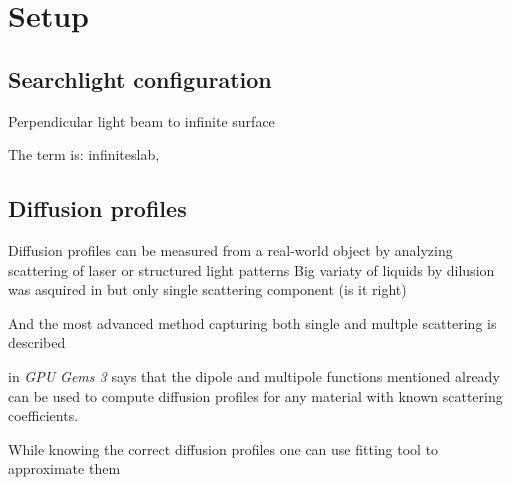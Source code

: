 \chapter{Setup}
\label{chapter:Setup}

\section{Searchlight configuration}
Perpendicular light beam to infinite surface \cite{Jacques1995}

The term is: \gls{infiniteslab},


\section{Diffusion profiles}
\begin{itemize}
  \item{Diffusion profiles can be measured from a real-world object by analyzing
  scattering of laser \cite{Jensen:2001:PMS:383259.383319} or structured light
  patterns \cite{tariq_efficient_2006-1} Big variaty of liquids by dilusion
  was asquired in \cite{Narasimhan:2006:ASP:1141911.1141986} but only single
  scattering component (is it right)
  \item{And the most advanced method capturing both single and multple
  scattering is described \cite{Gkioulekas:2013:IVR:2508363.2508377}}}
\item{\cite{Nguyen:2007:GG:1407436} in \textit{GPU Gems 3} says that
the dipole and multipole functions mentioned already can be used to compute diffusion profiles
for any material with known scattering coefficients.
}
\item{While knowing the correct diffusion profiles one can use fitting tool to approximate them \cite{Nguyen:2007:GG:1407436}}
\end{itemize}